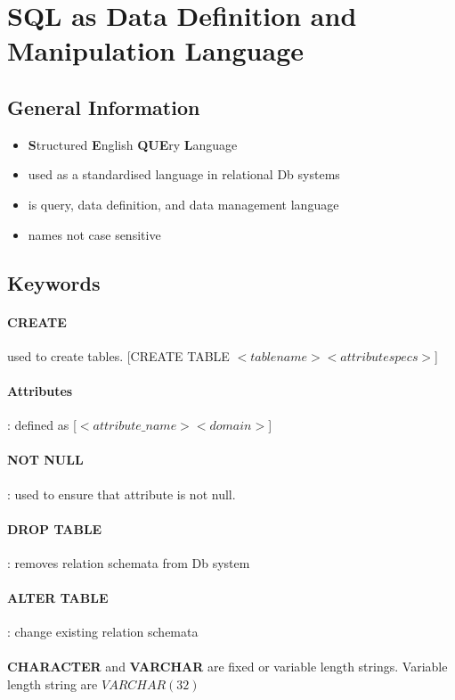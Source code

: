 \documentclass{article}
\begin{document}
\section{SQL as Data Definition and Manipulation Language}
	\subsection{General Information}
		\begin{itemize}
			\item \textbf{S}tructured \textbf{E}nglish \textbf{QUE}ry \textbf{L}anguage
			\item used as a standardised language in relational Db systems
			\item is query, data definition, and data management language
			\item names not case sensitive
		\end{itemize}

	\subsection{Keywords}
		\paragraph{CREATE} used to create tables. [CREATE TABLE $<tablename> <attribute specs>$]
		\paragraph{Attributes}: defined as [$<attribute\_name> <domain>$]
		\paragraph{NOT NULL}: used to ensure that attribute is not null.
		\paragraph{DROP TABLE}: removes relation schemata from Db system
		\paragraph{ALTER TABLE}: change existing relation schemata
		\\ \\ \textbf{CHARACTER} and \textbf{VARCHAR} are fixed or variable length strings. Variable length string are $VARCHAR(32)$
\end{document}
